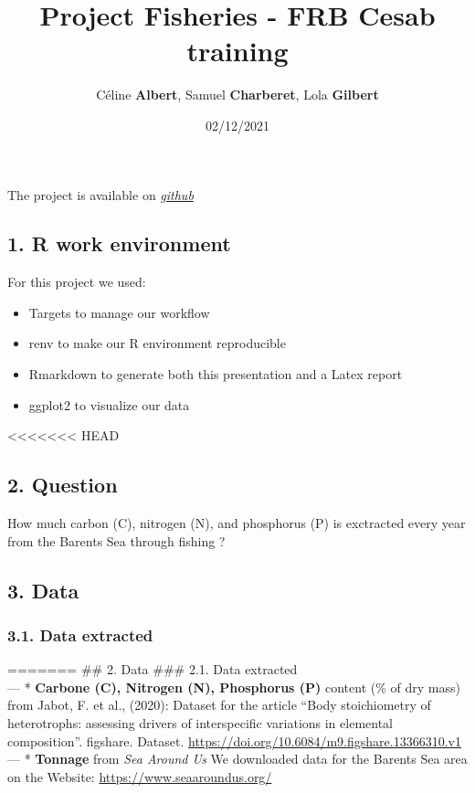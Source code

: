 \documentclass[
]{article}
\title{\textbf{Project Fisheries - FRB Cesab training}}
\author{Céline \textbf{Albert}, Samuel \textbf{Charberet}, Lola
\textbf{Gilbert}}
\date{02/12/2021}
\providecommand{\tightlist}{%
  \setlength{\itemsep}{0pt}\setlength{\parskip}{0pt}}
\begin{document}
\maketitle

The project is available on
\emph{\href{https://github.com/samuelcharberet/project.frb.fisheries}{github}}

\hypertarget{r-work-environment}{%
\subsection{1. R work environment}\label{r-work-environment}}

For this project we used:

\begin{itemize}
\tightlist
\item
  Targets to manage our workflow
\item
  renv to make our R environment reproducible
\item
  Rmarkdown to generate both this presentation and a Latex report
\item
  ggplot2 to visualize our data
\end{itemize}

\textless\textless\textless\textless\textless\textless\textless{} HEAD

\hypertarget{question}{%
\subsection{2. Question}\label{question}}

How much carbon (C), nitrogen (N), and phosphorus (P) is exctracted
every year from the Barents Sea through fishing ?

\hypertarget{data}{%
\subsection{3. Data}\label{data}}

\hypertarget{data-extracted}{%
\subsubsection{3.1. Data extracted}\label{data-extracted}}

======= \#\# 2. Data \#\#\# 2.1. Data extracted\\
--- * \textbf{Carbone (C), Nitrogen (N), Phosphorus (P)} content (\% of
dry mass) from Jabot, F. et al., (2020): Dataset for the article ``Body
stoichiometry of heterotrophs: assessing drivers of interspecific
variations in elemental composition''. figshare. Dataset.
\url{https://doi.org/10.6084/m9.figshare.13366310.v1}\\
--- * \textbf{Tonnage} from \emph{Sea Around Us} We downloaded data for
the Barents Sea area on the Website: \url{https://www.seaaroundus.org/}
\end{document}
